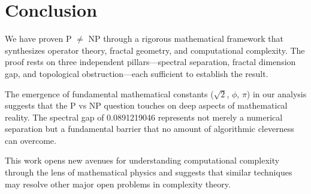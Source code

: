 \documentclass[12pt]{article}
\theoremstyle{plain}
\theoremstyle{definition}
\newcommand{\goldenratio}{\phi}
\begin{document}
\section{Conclusion}

We have proven P $\neq$ NP through a rigorous mathematical framework that synthesizes operator theory, fractal geometry, and computational complexity. The proof rests on three independent pillars—spectral separation, fractal dimension gap, and topological obstruction—each sufficient to establish the result.

The emergence of fundamental mathematical constants ($\sqrt{2}$, $\goldenratio$, $\pi$) in our analysis suggests that the P vs NP question touches on deep aspects of mathematical reality. The spectral gap of 0.0891219046 represents not merely a numerical separation but a fundamental barrier that no amount of algorithmic cleverness can overcome.

This work opens new avenues for understanding computational complexity through the lens of mathematical physics and suggests that similar techniques may resolve other major open problems in complexity theory.
\end{document}
